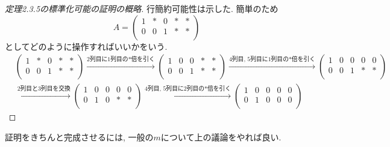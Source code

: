 \documentclass[dvipdfmx,a4paper,11pt]{article} %
\theoremstyle{definition}
\begin{document}
 \begin{proof}[定理2.3.5の標準化可能の証明の概略]
行簡約可能性は示した. 
簡単のため
 $$
 A=
   \begin{pmatrix}
 1&  \ast &  0 &  \ast& \ast\\
0 &  0 &  1&  \ast& \ast\\
 \end{pmatrix}
 $$
 としてどのように操作すればいいかをいう. 
 \begin{align*}
  &  \begin{pmatrix}
 1&  \ast &  0 &  \ast& \ast\\
0 &  0 &  1&  \ast& \ast\\
 \end{pmatrix}
  \overset{\text{2列目に1列目の$\ast$倍を引く}}{\longrightarrow}  
   \begin{pmatrix}
 1&  0&  0 &  \ast& \ast\\
0 &  0 &  1&  \ast& \ast\\
 \end{pmatrix}
   \overset{\text{4列目, 5列目に1列目の$\ast$倍を引く}}{\longrightarrow}  
   \begin{pmatrix}
 1&  0&  0 &  0& 0\\
0 &  0 &  1&  \ast& \ast\\
 \end{pmatrix}
 \\
 &   \overset{\text{2列目と3列目を交換}}{\longrightarrow}  
   \begin{pmatrix}
 1&  0&  0 &  0& 0\\
0 &  1 &  0&  \ast& \ast\\
 \end{pmatrix}
  \overset{\text{4列目, 5列目に2列目の$\ast$倍を引く}}{\longrightarrow}  
   \begin{pmatrix}
 1&  0&  0 &  0& 0\\
0 &  1 &  0&  0& 0\\
 \end{pmatrix}
 \end{align*}
\end{proof}
証明をきちんと完成させるには, 一般の$m$について上の議論をやれば良い. 
\end{document}
